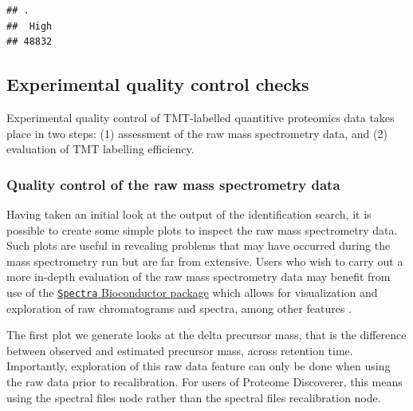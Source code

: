\documentclass[9pt,a4paper,]{extarticle}
\begin{document}
\begin{verbatim}
## .
##  High 
## 48832
\end{verbatim}

\subsection{Experimental quality control checks}\label{experimental-quality-control-checks}

Experimental quality control of TMT-labelled quantitive proteomics data takes
place in two steps: (1) assessment of the raw mass spectrometry data, and (2)
evaluation of TMT labelling efficiency.

\subsubsection{Quality control of the raw mass spectrometry data}\label{quality-control-of-the-raw-mass-spectrometry-data}

Having taken an initial look at the output of the identification search, it is
possible to create some simple plots to inspect the raw mass spectrometry data.
Such plots are useful in revealing problems that may have occurred during
the mass spectrometry run but are far from extensive. Users who wish to carry
out a more in-depth evaluation of the raw mass spectrometry data may benefit
from use of the
\href{https://bioconductor.org/packages/release/bioc/html/Spectra.html}{\texttt{Spectra} Bioconductor package}
which allows for visualization and exploration of raw chromatograms and spectra,
among other features \citep{Rainer2022}.

The first plot we generate looks at the delta precursor mass, that is the
difference between observed and estimated precursor mass, across retention time.
Importantly, exploration of this raw data feature can only be done when using
the raw data prior to recalibration. For users of Proteome Discoverer, this
means using the spectral files node rather than the spectral files recalibration
node.
\end{document}
